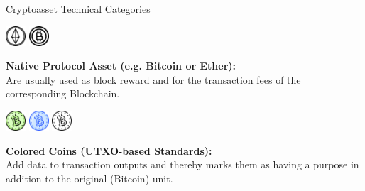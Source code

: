 \documentclass[handout]{beamer}
\begin{document}
\begin{frame}{Cryptoasset Technical Categories}
	\begin{minipage}{0.2\textwidth}
			\begin{center}
				\includegraphics[height=2em]{../assets/images/ethertoken}
				\includegraphics[height=2em]{../assets/images/bitcointoken}
			\end{center}
		\end{minipage}
		\begin{minipage}{0.75\textwidth}
			\textbf{Native Protocol Asset (e.g. Bitcoin or Ether):} \\
			Are usually used as block reward and for the transaction fees of the corresponding Blockchain.
		\end{minipage}
	
		\pause
		\vspace{2 em}
		\begin{minipage}{0.2\textwidth}
			\begin{center}
				\includegraphics[height=2em]{../assets/images/green_coin}
				\includegraphics[height=2em]{../assets/images/blue_coin}
				\includegraphics[height=2em]{../assets/images/grey_coin}
			\end{center}
		\end{minipage}
		\begin{minipage}{0.75\textwidth}
			\textbf{Colored Coins (UTXO-based Standards):} \\
			Add data to transaction outputs and thereby marks them as having a purpose in addition to the original (Bitcoin) unit.
		\end{minipage}
	

\end{frame}
\end{document}
